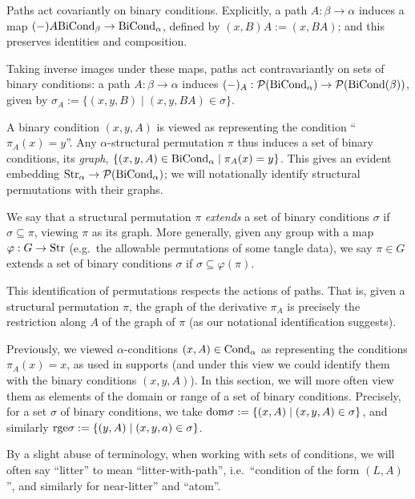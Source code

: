 \begin{definition}
  \label{def:condition-functoriality}
  Paths act covariantly on binary conditions.  Explicitly, a path $A : \beta \to \alpha$ induces a map $(-)A \mathrm{BiCond}_\beta \to \mathrm{BiCond}_\alpha$, defined by $(x,B)A := (x,BA)$; and this preserves identities and composition.

  Taking inverse images under these maps, paths act contravariantly on sets of binary conditions: a path $A : \beta \to \alpha$ induces $(-)_A : \mathcal{P}(\mathrm{BiCond}_\alpha) \to \mathcal{P}(\mathrm{BiCond}(\beta))$, given by $\sigma_A := \{ (x,y,B) \mid (x,y,BA) \in \sigma \}$.
\end{definition}

\begin{definition}
  \label{def:conditions-from-perm}
  A binary condition $(x,y,A)$ is viewed as representing the condition “$\pi_A(x) = y$”.  Any $\alpha$-structural permutation $\pi$ thus induces a set of binary conditions, its \emph{graph}, $\{ (x,y,A) \in \mathrm{BiCond}_\alpha \mid \pi_A(x) = y \}$.  This gives an evident embedding $\mathrm{Str}_\alpha \to \mathcal{P}(\mathrm{BiCond}_\alpha)$; we will notationally identify structural permutations with their graphs.

  We say that a structural permutation $\pi$ \emph{extends} a set of binary conditions $\sigma$ if $\sigma \subseteq \pi$, viewing $\pi$ as its graph.  More generally, given any group with a map $\varphi : G \to \mathrm{Str}$ (e.g.\ the allowable permutations of some tangle data), we say $\pi \in G$ extends a set of binary conditions $\sigma$ if $\sigma \subseteq \varphi(\pi)$.
\end{definition}

\begin{proposition}
  \label{prop:conditions-from-perm-restriction}
  This identification of permutations respects the actions of paths.  That is, given a structural permutation $\pi$, the graph of the derivative $\pi_A$ is precisely the restriction along $A$ of the graph of $\pi$ (as our notational identification suggests).
\end{proposition}

\begin{definition}
  \label{def:condition-dom-rge}
  Previously, we viewed $\alpha$-conditions $(x,A) \in \mathrm{Cond}_\alpha$ as representing the conditions $\pi_A(x) = x$, as used in supports (and under this view we could identify them with the binary conditions $(x,y,A)$).  In this section, we will more often view them as elements of the domain or range of a set of binary conditions.  Precisely, for a set $\sigma$ of binary conditions, we take $\mathrm{dom} \sigma := \{ (x,A) \mid (x,y,A) \in \sigma \}$, and similarly $\mathrm{rge} \sigma := \{ (y,A) \mid (x,y,a) \in \sigma \}$.

  By a slight abuse of terminology, when working with sets of conditions, we will often say “litter” to mean “litter-with-path”, i.e.\ “condition of the form $(L,A)$”, and similarly for near-litter” and “atom”.
\end{definition}

